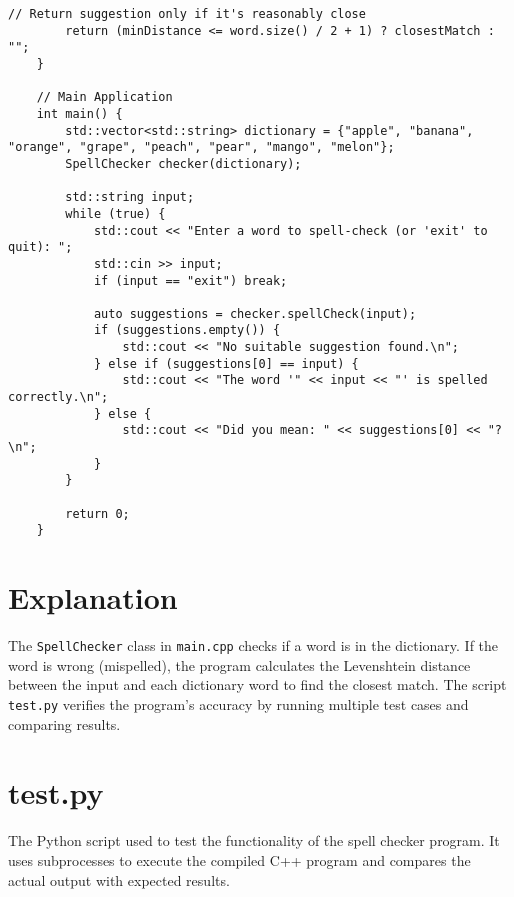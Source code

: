 \documentclass{article}
\begin{document}
\begin{lstlisting}[caption={main.cpp}, label={lst:main}]
        // Return suggestion only if it's reasonably close
        return (minDistance <= word.size() / 2 + 1) ? closestMatch : "";
    }
    
    // Main Application
    int main() {
        std::vector<std::string> dictionary = {"apple", "banana", "orange", "grape", "peach", "pear", "mango", "melon"};
        SpellChecker checker(dictionary);
    
        std::string input;
        while (true) {
            std::cout << "Enter a word to spell-check (or 'exit' to quit): ";
            std::cin >> input;
            if (input == "exit") break;
    
            auto suggestions = checker.spellCheck(input);
            if (suggestions.empty()) {
                std::cout << "No suitable suggestion found.\n";
            } else if (suggestions[0] == input) {
                std::cout << "The word '" << input << "' is spelled correctly.\n";
            } else {
                std::cout << "Did you mean: " << suggestions[0] << "?\n";
            }
        }
    
        return 0;
    }    
\end{lstlisting}

\section*{Explanation}
The \texttt{SpellChecker} class in \texttt{main.cpp} checks if a word is in the dictionary. If the word is wrong (mispelled), the program calculates the Levenshtein distance between the input and each dictionary word to find the closest match. The script \texttt{test.py} verifies the program's accuracy by running multiple test cases and comparing results.

\section*{test.py}
The Python script used to test the functionality of the spell checker program. It uses subprocesses to execute the compiled C++ program and compares the actual output with expected results.
\end{document}
